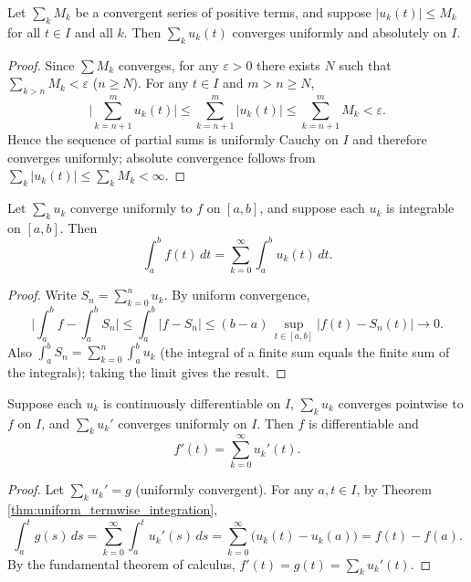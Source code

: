 \begin{theorem}\label{thm:weierstrass_mtest}
Let $\sum_k M_k$ be a convergent series of positive terms, and suppose $|u_k(t)| \le M_k$ for all $t \in I$ and all $k$. Then $\sum_k u_k(t)$ converges uniformly and absolutely on $I$.
\end{theorem}

\begin{proof}
Since $\sum M_k$ converges, for any $\varepsilon > 0$ there exists $N$ such that $\sum_{k>n} M_k < \varepsilon$ ($n \ge N$). For any $t \in I$ and $m > n \ge N$,
\[
\Big| \sum_{k=n+1}^{m} u_k(t) \Big| \le \sum_{k=n+1}^{m} |u_k(t)| \le \sum_{k=n+1}^{m} M_k < \varepsilon.
\]
Hence the sequence of partial sums is uniformly Cauchy on $I$ and therefore converges uniformly; absolute convergence follows from $\sum_k |u_k(t)| \le \sum_k M_k < \infty$.
\end{proof}

\begin{theorem}\label{thm:uniform_termwise_integration}
Let $\sum_k u_k$ converge uniformly to $f$ on $[a,b]$, and suppose each $u_k$ is integrable on $[a,b]$. Then
\[
\int_a^b f(t)\,dt = \sum_{k=0}^{\infty} \int_a^b u_k(t)\,dt.
\]
\end{theorem}

\begin{proof}
Write $S_n = \sum_{k=0}^{n} u_k$. By uniform convergence,
\[
\Big| \int_a^b f - \int_a^b S_n \Big| \le \int_a^b |f - S_n| \le (b-a)\, \sup_{t \in [a,b]} |f(t) - S_n(t)| \to 0.
\]
Also $\int_a^b S_n = \sum_{k=0}^{n} \int_a^b u_k$ (the integral of a finite sum equals the finite sum of the integrals); taking the limit gives the result.
\end{proof}

\begin{theorem}\label{thm:uniform_termwise_differentiation}
Suppose each $u_k$ is continuously differentiable on $I$, $\sum_k u_k$ converges pointwise to $f$ on $I$, and $\sum_k u_k'$ converges uniformly on $I$. Then $f$ is differentiable and
\[
f'(t) = \sum_{k=0}^{\infty} u_k'(t).
\]
\end{theorem}

\begin{proof}
Let $\sum_k u_k' = g$ (uniformly convergent). For any $a, t \in I$, by Theorem \ref{thm:uniform_termwise_integration},
\[
\int_a^t g(s)\,ds = \sum_{k=0}^{\infty} \int_a^t u_k'(s)\,ds = \sum_{k=0}^{\infty} \big( u_k(t) - u_k(a) \big) = f(t) - f(a).
\]
By the fundamental theorem of calculus, $f'(t) = g(t) = \sum_k u_k'(t)$.
\end{proof}

